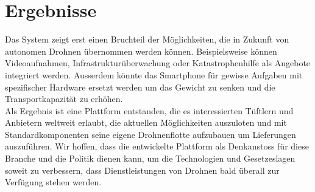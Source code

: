 \section*{Ergebnisse}
Das System zeigt erst einen Bruchteil der Möglichkeiten, die in Zukunft von autonomen Drohnen übernommen werden können. Beispielsweise können Videoaufnahmen, Infrastrukturüberwachung oder Katastrophenhilfe als Angebote integriert werden. Ausserdem könnte das Smartphone für gewisse Aufgaben mit spezifischer Hardware ersetzt werden um das Gewicht zu senken und die Transportkapazität zu erhöhen. \\

Als Ergebnis ist eine Plattform entstanden, die es interessierten Tüftlern und Anbietern weltweit erlaubt, die aktuellen Möglichkeiten auszuloten und mit Standardkomponenten seine eigene Drohnenflotte aufzubauen um Lieferungen auszuführen. Wir hoffen, dass die entwickelte Plattform als Denkanstoss für diese Branche und die Politik dienen kann, um die Technologien und Gesetzeslagen soweit zu verbessern, dass Dienstleistungen von Drohnen bald überall zur Verfügung stehen werden.
